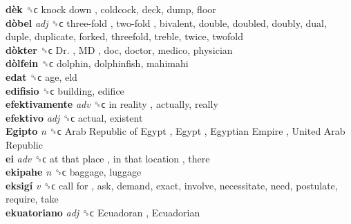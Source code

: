 \textbf{dèk} ␝ϲ   knock down , coldcock, deck, dump, floor  \\
\textbf{dòbel} \emph{adj}  ␝ϲ   three-fold ,  two-fold , bivalent, double, doubled, doubly, dual, duple, duplicate, forked, threefold, treble, twice, twofold  \\
\textbf{dòkter} ␝ϲ   Dr. ,  MD , doc, doctor, medico, physician  \\
\textbf{dòlfein} ␝ϲ  dolphin, dolphinfish, mahimahi  \\
\textbf{edat} ␝ϲ  age, eld  \\
\textbf{edifisio} ␝ϲ  building, edifice  \\
\textbf{efektivamente} \emph{adv}  ␝ϲ   in reality , actually, really  \\
\textbf{efektivo} \emph{adj}  ␝ϲ  actual, existent  \\
\textbf{Egipto} \emph{n}  ␝ϲ   Arab Republic of Egypt ,  Egypt ,  Egyptian Empire ,  United Arab Republic   \\
\textbf{ei} \emph{adv}  ␝ϲ   at that place ,  in that location , there  \\
\textbf{ekipahe} \emph{n}  ␝ϲ  baggage, luggage  \\
\textbf{eksigí} \emph{v}  ␝ϲ   call for , ask, demand, exact, involve, necessitate, need, postulate, require, take  \\
\textbf{ekuatoriano} \emph{adj}  ␝ϲ   Ecuadoran ,  Ecuadorian   \\
